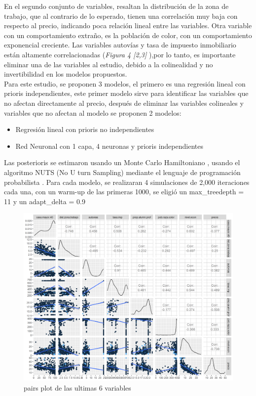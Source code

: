 \documentclass[nojss]{jss}
\begin{document}
En el segundo conjunto de variables, resaltan la distribución de la zona de trabajo, que al contrario de lo esperado, tienen una correlación muy baja con respecto al precio, indicando poca relación lineal entre las variables. Otra variable con un comportamiento extraño, es la población de color, con un comportamiento exponencial creciente. Las variables autovías y tasa de impuesto inmobiliario están altamente correlacionadas (\textit{Figura 4 [2,3]} ),por lo tanto, es importante eliminar una de las variables al estudio, debido a la colinealidad y no invertibilidad en los modelos propuestos. \\  

Para este estudio, se proponen 3 modelos, el primero es una regresión lineal con prioris independientes, este primer modelo sirve para identificar las variables que no afectan directamente al precio, después de eliminar las variables colineales y variables que no afectan al modelo se proponen 2 modelos:
\begin{itemize}
	\item Regresión lineal con prioris no independientes
	\item Red Neuronal con 1 capa, 4 neuronas y prioris independientes
\end{itemize}

Las posterioris se estimaron usando un Monte Carlo Hamiltoniano \cite{DUANE1987216} \cite{betancourt2017}, usando el algoritmo NUTS (No U turn Sampling) \cite{hoffman14a} mediante el lenguaje de programación probabilista \cite{Stan}. Para cada modelo, se realizaran 4 simulaciones de 2,000 iteraciones cada una, con un warm-up de las primeras 1000, se eligió un max\_treedepth = 11 y un adapt\_delta = 0.9

\begin{figure}[H]
	\centering
	\includegraphics[scale=1]{images/pairs2-1}
	\caption[pairs]{pairs plot de las ultimas 6 variables}
	\label{fig:fig4}
\end{figure}  
\end{document}
